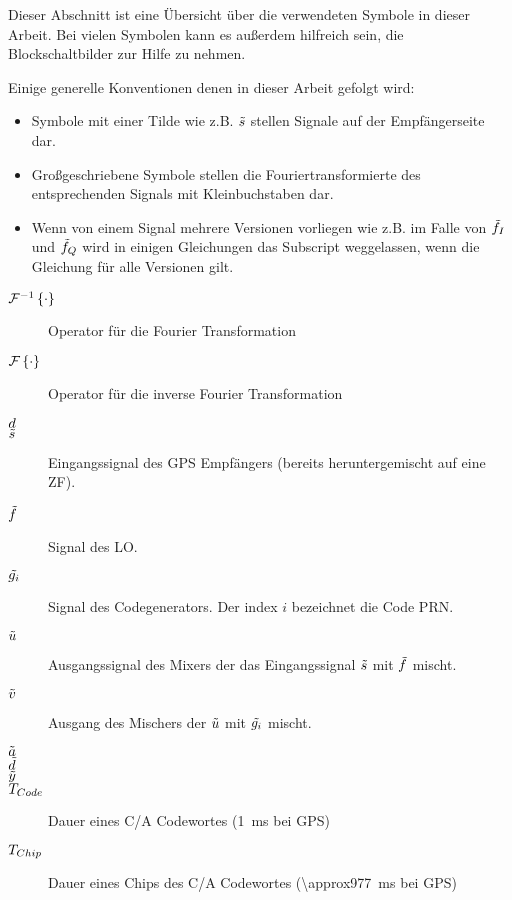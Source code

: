 Dieser Abschnitt ist eine Übersicht über die verwendeten Symbole in dieser Arbeit. Bei vielen Symbolen kann es außerdem hilfreich sein, die Blockschaltbilder zur Hilfe zu nehmen. 

Einige generelle Konventionen denen in dieser Arbeit gefolgt wird: 
\begin{itemize}
\item Symbole mit einer Tilde wie z.B. $\tilde{s}$ stellen Signale auf der Empfängerseite dar. 
\item Großgeschriebene Symbole stellen die Fouriertransformierte des entsprechenden Signals mit Kleinbuchstaben dar.
\item Wenn von einem Signal mehrere Versionen vorliegen wie z.B. im Falle von $\tilde{f}_I$ und $\tilde{f}_Q$ wird in einigen Gleichungen das Subscript weggelassen, wenn die Gleichung für alle Versionen gilt.
\end{itemize}

\begin{scriptsize}

\begin{description}
\item [$\mathcal{F}^{-1}\left\{\cdot\right\}$] Operator für die Fourier Transformation
\item [$\mathcal{F}\left\{\cdot\right\}$] Operator für die inverse Fourier Transformation %

\item [$d$] %
\item [$\tilde{s}$] Eingangssignal des GPS Empfängers (bereits heruntergemischt auf eine ZF).%
\item [$\tilde{f}$] Signal des \gls{LO}.%
\item [$\tilde{g_i}$] Signal des Codegenerators. Der index $i$ bezeichnet die Code PRN. %
\item [$\tilde{u}$] Ausgangssignal des Mixers der das Eingangssignal $\tilde{s}$ mit $\tilde{f}$ mischt. %
\item [$\tilde{v}$] Ausgang des Mischers der $\tilde{u}$ mit $\tilde{g_i}$ mischt.%
\item [$\tilde{a}$] %
\item [$\tilde{d}$] %
\item [$\tilde{y}$] %

\item [${T}_{Code}$] Dauer eines C/A Codewortes (\SI{1}{\ms} bei GPS)%
\item [${T}_{Chip}$] Dauer eines Chips des C/A Codewortes (\SI{\approx977}{\ms} bei GPS)%

\end{description}

\end{scriptsize}
